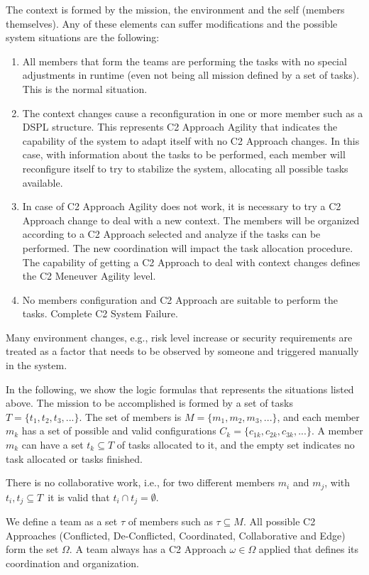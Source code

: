 
The context is formed by the mission, the environment and the self (members themselves). Any of these elements can suffer modifications and the possible system situations are the following:
\begin{enumerate}
    \item All members that form the teams are performing the tasks with no special adjustments in runtime (even not being all mission defined by a set of tasks). This is the normal situation.
    \item The context changes cause a reconfiguration in one or more member such as a DSPL structure. This represents C2 Approach Agility that indicates the capability of the system to adapt itself with no C2 Approach changes. In this case, with information about the tasks to be performed, each member will reconfigure itself to try to stabilize the system, allocating all possible tasks available.
    \item In case of C2 Approach Agility does not work, it is necessary to try a C2 Approach change to deal with a new context. The members will be organized according to a C2 Approach selected and analyze if the tasks can be performed. The new coordination will impact the task allocation procedure. The capability of getting a C2 Approach to deal with context changes defines the C2 Meneuver Agility level.
    \item No members configuration and C2 Approach are suitable to perform the tasks. Complete C2 System Failure.
\end{enumerate}

Many environment changes, e.g., risk level increase or security requirements are treated as a factor that needs to be observed by someone and triggered manually in the system.

In the following, we show the logic formulas that represents the situations listed above. The mission to be accomplished is formed by a set of tasks $T=\{t_1, t_2, t_3,...\}$. The set of members is $M = \{m_1, m_2, m_3,... \}$, and each member $m_k$ has a set of possible and valid configurations $C_k = \{c_{1k}, c_{2k}, c_{3k}, ... \}$. A member $m_k$ can have a set $t_k \subseteq T$ of tasks allocated to it, and the empty set indicates no task allocated or tasks finished.

There is no collaborative work, i.e., for two different members $m_i$ and $m_j$, with $t_i, t_j \subseteq T$\, it is valid that $t_i \cap t_j = \emptyset$.

We define a team as a set $\tau$ of members such as $\tau \subseteq M$. All possible C2 Approaches (Conflicted, De-Conflicted, Coordinated, Collaborative and Edge) form the set $\Omega$. A team always has a C2 Approach $\omega \in \Omega$ applied that defines its coordination and organization. 

